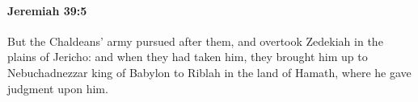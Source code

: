 
		\paragraph{Jeremiah 39:5} %
			\label{JEREMIAH-39-5}

			But the Chaldeans’ army pursued after them, and overtook Zedekiah in the plains of Jericho: and when they had taken him, they brought him up to Nebuchadnezzar king of Babylon to Riblah in the land of Hamath, where he gave judgment upon him.


